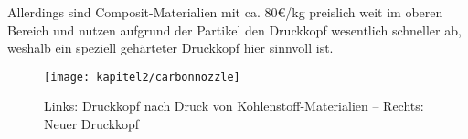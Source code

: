 Allerdings sind Composit-Materialien mit ca. 80€/kg preislich weit im oberen Bereich und nutzen aufgrund der Partikel den Druckkopf wesentlich schneller ab, weshalb ein speziell gehärteter Druckkopf hier sinnvoll ist.

\begin{figure}[h]
  \centering
  \texttt{[image: kapitel2/carbonnozzle]}
  \caption{Links: Druckkopf nach Druck von Kohlenstoff-Materialien -- Rechts: Neuer Druckkopf}
  \label{Kap2:CompositNozzle}
\end{figure}